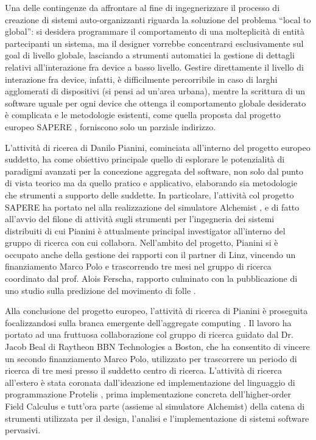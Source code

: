 \documentclass[10pt]{article}
\begin{document}
Una delle contingenze da affrontare al fine di ingegnerizzare il processo di creazione di sistemi auto-organizzanti riguarda la soluzione del problema ``local to global'': si desidera programmare il comportamento di una molteplicità di entità partecipanti un sistema, ma il designer vorrebbe concentrarsi esclusivamente sul goal di livello globale, lasciando a strumenti automatici la gestione di dettagli relativi all'interazione fra device a basso livello. Gestire direttamente il livello di interazione fra device, infatti, è difficilmente percorribile in caso di larghi agglomerati di dispositivi (si pensi ad un’area urbana), mentre la scrittura di un software uguale per ogni device che ottenga il comportamento globale desiderato è complicata e le metodologie esistenti, come quella proposta dal progetto europeo SAPERE \cite{ZambonelliPMC2015}, forniscono solo un parziale indirizzo.

L’attività di ricerca di Danilo Pianini, cominciata all'interno del progetto europeo suddetto, ha come obiettivo principale quello di esplorare le potenzialità di paradigmi avanzati per la concezione aggregata del software, non solo dal punto di vista teorico ma da quello pratico e applicativo, elaborando sia metodologie che strumenti a supporto delle suddette.
In particolare, l'attività col progetto SAPERE ha portato nel alla realizzazione del simulatore Alchemist \cite{PianiniJOS2013}, e di fatto all'avvio del filone di attività sugli strumenti per l'ingegneria dei sistemi distribuiti di cui Pianini è attualmente principal investigator all'interno del gruppo di ricerca con cui collabora. Nell'ambito del progetto, Pianini si è occupato anche della gestione dei rapporti con il partner di Linz, vincendo un finanziamento Marco Polo e trascorrendo tre mesi nel gruppo di ricerca coordinato dal prof. Alois Ferscha, rapporto culminato con la pubblicazione di uno studio sulla predizione del movimento di folle \cite{AnzengruberSocInfo2013}.

Alla conclusione del progetto europeo, l'attività di ricerca di Pianini è proseguita focalizzandosi sulla branca emergente dell'aggregate computing \cite{ViroliCoordination2012}. Il lavoro ha portato ad una fruttuosa collaborazione col gruppo di ricerca guidato dal Dr. Jacob Beal di Raytheon BBN Technologies a Boston, che ha consentito di vincere un secondo finanziamento Marco Polo, utilizzato per trascorrere un periodo di ricerca di tre mesi presso il suddetto centro di ricerca. L'attività di ricerca all'estero è stata coronata dall'ideazione ed implementazione del linguaggio di programmazione Protelis \cite{PianiniSAC2015}, prima implementazione concreta dell'higher-order Field Calculus \cite{DamianiFORTE2015} e tutt'ora parte (assieme al simulatore Alchemist) della catena di strumenti utilizzata per il design, l'analisi e l'implementazione di sistemi software pervasivi.
\end{document}
